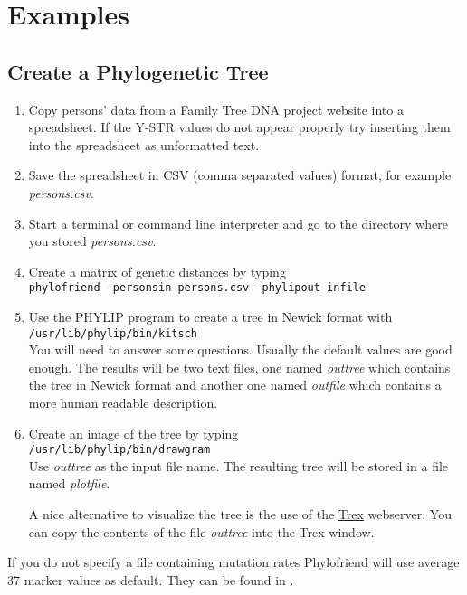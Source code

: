 \section{Examples}

\subsection{Create a Phylogenetic Tree}

\begin{enumerate}
\item Copy persons' data from a Family Tree DNA project website into
	a spreadsheet. If the Y-STR values do not appear properly try
	inserting them into the spreadsheet as unformatted text.
\item Save the spreadsheet in CSV (comma separated values)
	format, for example \emph{persons.csv}.
\item Start a terminal or command line interpreter and go
	to the directory where you stored \emph{persons.csv}.
\item Create a matrix of genetic distances by typing\\
	\texttt{phylofriend -personsin persons.csv -phylipout infile}
\item Use the PHYLIP program to create a tree in Newick format
	with\\
	\texttt{/usr/lib/phylip/bin/kitsch}\\
	You will need to answer some questions. Usually the
	default values are good enough. The results will be
	two text files, one named \emph{outtree} which contains
	the tree in Newick format and another one named
	\emph{outfile} which contains a more human readable
	description.
\item Create an image of the tree by typing\\
	\texttt{/usr/lib/phylip/bin/drawgram}\\
	Use \emph{outtree} as the input file name.
	The resulting tree will be stored in a file named 
	\emph{plotfile}.

	A nice alternative to visualize the tree is the use of the
	\href{http://www.trex.uqam.ca/index.php?action=newick&project=trex}
	{Trex}\cite{Trex}
	webserver. You can copy the contents of the file \emph{outtree}
	into the Trex window.
\end{enumerate}

If you do not specify a file containing mutation rates
Phylofriend will use average 37 marker values as default.
They can be found in \cite{Kly12}.


